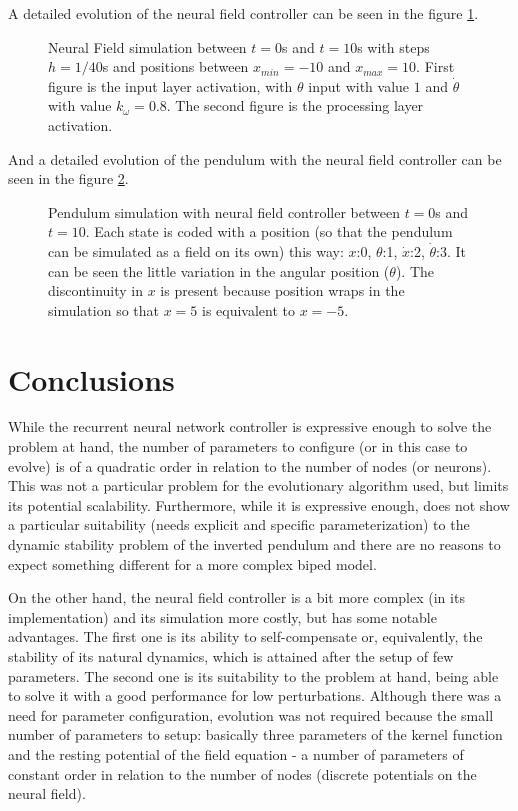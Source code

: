 \documentclass{sig-alternate}
\begin{document}
A detailed evolution of the neural field controller can be seen in the
figure \ref{fig:nf-controller}.

\begin{figure}[t]
  \centering
  \caption{Neural Field simulation between $t=0$s and $t=10$s with
    steps $h=1/40$s and positions between $x_{min}=-10$ and
    $x_{max}=10$. First figure is the input layer activation, with
    $\theta$ input with value $1$ and $\dot{\theta}$ with value
    $k_{\omega}=0.8$. The second figure is the processing layer
    activation.}
  \label{fig:nf-controller}
\end{figure}

And a detailed evolution of the pendulum with the neural field
controller can be seen in the figure \ref{fig:nf-pendulum}.

\begin{figure}[t]
  \centering
  \caption{Pendulum simulation with neural field controller between
    $t=0$s and $t=10$. Each state is coded with a position (so that
    the pendulum can be simulated as a field on its own) this way:
    $x$:0, $\theta$:1, $\dot{x}$:2, $\dot{\theta}$:3. It can be seen
    the little variation in the angular position ($\theta$). The
    discontinuity in $x$ is present because position wraps in the
    simulation so that $x=5$ is equivalent to $x=-5$.}
  \label{fig:nf-pendulum}
\end{figure}



\section{Conclusions}
While the recurrent neural network controller is expressive enough to
solve the problem at hand, the number of parameters to configure (or
in this case to evolve) is of a quadratic order in relation to the
number of nodes (or neurons). This was not a particular problem for
the evolutionary algorithm used, but limits its potential
scalability. Furthermore, while it is expressive enough, does not show
a particular suitability (needs explicit and specific
parameterization) to the dynamic stability problem of the inverted
pendulum and there are no reasons to expect something different for a
more complex biped model.

On the other hand, the neural field controller is a bit more complex
(in its implementation) and its simulation more costly, but has some
notable advantages. The first one is its ability to self-compensate
or, equivalently, the stability of its natural dynamics, which is
attained after the setup of few parameters. The second one is its
suitability to the problem at hand, being able to solve it with a
good performance for low perturbations. Although
there was a need for parameter configuration, evolution was not
required because the small number of parameters to setup: basically
three parameters of the kernel function and the resting potential of
the field equation - a number of parameters of constant order in
relation to the number of nodes (discrete potentials on the neural
field).
\end{document}
